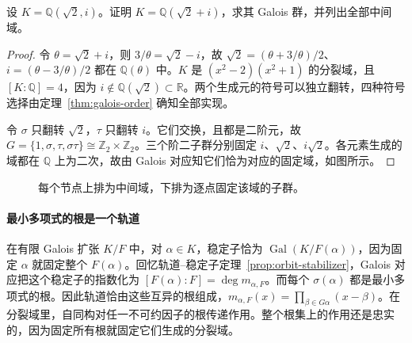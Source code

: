 \documentclass[lang=cn,a4paper,fontset=none,zihao=false,10pt,openany,twoside]{beautybook}
\numberwithin{algorithm}{chapter}
\begin{document}
\begin{example}[双二次扩张的中间域]\label{ex:galois-biquadratic}
设 $K=\mathbb Q(\sqrt2,i)$。证明 $K=\mathbb Q(\sqrt2+i)$，求其 Galois 群，并列出全部中间域。
\end{example}
\begin{proof}
令 $\theta=\sqrt2+i$，则 $3/\theta=\sqrt2-i$，故 $\sqrt2=(\theta+3/\theta)/2$、$i=(\theta-3/\theta)/2$ 都在 $\mathbb Q(\theta)$ 中。$K$ 是 $(x^2-2)(x^2+1)$ 的分裂域，且 $[K:\mathbb Q]=4$，因为 $i\notin\mathbb Q(\sqrt2)\subset\mathbb R$。两个生成元的符号可以独立翻转，四种符号选择由定理~\ref{thm:galois-order} 确知全部实现。

令 $\sigma$ 只翻转 $\sqrt2$，$\tau$ 只翻转 $i$。它们交换，且都是二阶元，故 $G=\{1,\sigma,\tau,\sigma\tau\}\cong\mathbb Z_2\times\mathbb Z_2$。三个阶二子群分别固定 $i$、$\sqrt2$、$i\sqrt2$。各元素生成的域都在 $\mathbb Q$ 上为二次，故由 Galois 对应知它们恰为对应的固定域，如图所示。
\end{proof}
\begin{figure}[H]
\centering
{}
\caption{每个节点上排为中间域，下排为逐点固定该域的子群。}
\end{figure}

\paragraph{最小多项式的根是一个轨道}
在有限 Galois 扩张 $K/F$ 中，对 $\alpha\in K$，稳定子恰为 $\operatorname{Gal}(K/F(\alpha))$，因为固定 $\alpha$ 就固定整个 $F(\alpha)$。回忆轨道--稳定子定理~\ref{prop:orbit-stabilizer}，Galois 对应把这个稳定子的指数化为 $[F(\alpha):F]=\deg m_{\alpha,F}$。而每个 $\sigma(\alpha)$ 都是最小多项式的根。因此轨道恰由这些互异的根组成，$m_{\alpha,F}(x)=\prod_{\beta\in G\alpha}(x-\beta)$。在分裂域里，自同构对任一不可约因子的根传递作用。整个根集上的作用还是忠实的，因为固定所有根就固定它们生成的分裂域。
\end{document}
